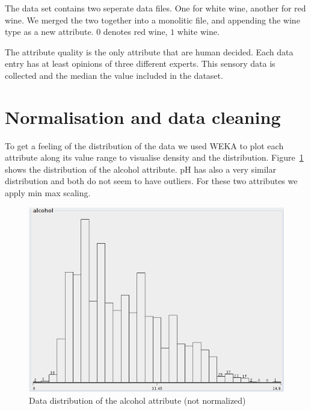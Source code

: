 \documentclass{acm_proc_article-sp}
\begin{document}
The data set contains two seperate data files. One for white wine,
another for red wine. We merged the two together into a monolitic file,
and appending the wine type as a new attribute. $0$ denotes red wine, $1$ white wine.

The attribute quality is the only attribute that are human decided.
Each data entry has at least opinions of three different experts. This
sensory data is collected and the median the value included in the
dataset.

\section{Normalisation and data cleaning}

To get a feeling of the distribution of the data we used
WEKA to plot each attribute along its value range to visualise
density and the distribution.
Figure~\ref{fig:dist-alcohol} shows the distribution of the alcohol attribute. pH has
also a very similar distribution and both do not seem to have outliers.
For these two attributes we apply min max scaling.

\begin{figure}
\centering
\includegraphics[width=\linewidth]{img/dist-alcohol}
\caption{Data distribution of the alcohol attribute (not normalized)}
\label{fig:dist-alcohol}
\end{figure}
\end{document}
